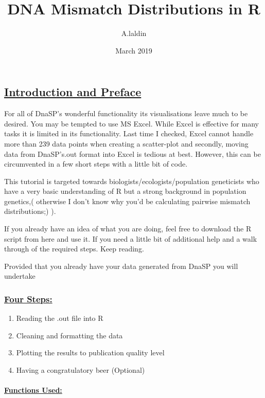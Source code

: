 \documentclass[]{article}
\title{DNA Mismatch Distributions in R}
\author{A.laldin}
\date{March 2019}
\providecommand{\tightlist}{%
  \setlength{\itemsep}{0pt}\setlength{\parskip}{0pt}}
\let\oldparagraph\paragraph
\renewcommand{\paragraph}[1]{\oldparagraph{#1}\mbox{}}
\begin{document}
\maketitle

\subsection{\texorpdfstring{\href{sheading-2}{Introduction and
Preface}}{Introduction and Preface}}\label{introduction-and-preface}

For all of DnaSP's wonderful functionality its visualisations leave much
to be desired. You may be tempted to use MS Excel. While Excel is
effective for many tasks it is limited in its functionality. Last time I
checked, Excel cannot handle more than 239 data points when creating a
scatter-plot and secondly, moving data from DnaSP's.out format into
Excel is tedious at best. However, this can be circumvented in a few
short steps with a little bit of code.

This tutorial is targeted towards biologists/ecologists/population
geneticists who have a very basic understanding of R but a strong
background in population genetics,( otherwise I don't know why you'd be
calculating pairwise mismatch distributions;) ).

If you already have an idea of what you are doing, feel free to download
the R script from here and use it. If you need a little bit of
additional help and a walk through of the required steps. Keep reading.

Provided that you already have your data generated from DnaSP you will
undertake

\subsubsection{\texorpdfstring{\href{sheading-2}{Four
Steps:}}{Four Steps:}}\label{four-steps}

\begin{enumerate}
\def\labelenumi{\arabic{enumi}.}
\tightlist
\item
  Reading the .out file into R
\item
  Cleaning and formatting the data
\item
  Plotting the results to publication quality level
\item
  Having a congratulatory beer (Optional)
\end{enumerate}

\paragraph{\texorpdfstring{\href{sheading-2}{Functions
Used:}}{Functions Used:}}\label{functions-used}
\end{document}
